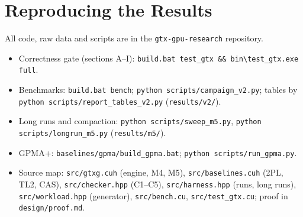 \documentclass[sigconf,nonacm]{acmart}
\newcommand{\code}[1]{\texttt{#1}}
\begin{document}



\appendix
\section{Reproducing the Results}
All code, raw data and scripts are in the \code{gtx-gpu-research} repository.
\begin{itemize}
\item Correctness gate (sections A--I): \code{build.bat test\_gtx \&\& bin\textbackslash test\_gtx.exe full}.
\item Benchmarks: \code{build.bat bench}; \code{python scripts/campaign\_v2.py}; tables by
\code{python scripts/report\_tables\_v2.py} (\code{results/v2/}).
\item Long runs and compaction: \code{python scripts/sweep\_m5.py}, \code{python scripts/longrun\_m5.py}
(\code{results/m5/}).
\item GPMA+: \code{baselines/gpma/build\_gpma.bat}; \code{python scripts/run\_gpma.py}.
\item Source map: \code{src/gtxg.cuh} (engine, M4, M5), \code{src/baselines.cuh} (2PL, TL2, CAS),
\code{src/checker.hpp} (C1--C5), \code{src/harness.hpp} (runs, long runs), \code{src/workload.hpp} (generator),
\code{src/bench.cu}, \code{src/test\_gtx.cu}; proof in \code{design/proof.md}.
\end{itemize}
\end{document}
